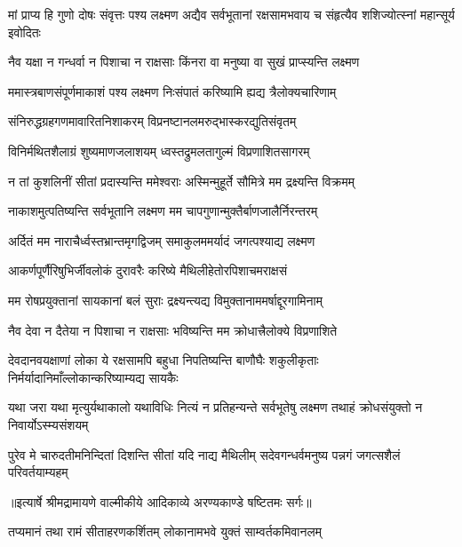 \threelineshloka
{मां प्राप्य हि गुणो दोषः संवृत्तः पश्य लक्ष्मण}
{अद्यैव सर्वभूतानां रक्षसामभवाय च}
{संहृत्यैव शशिज्योत्स्नां महान्सूर्य इवोदितः} %

\twolineshloka
{नैव यक्षा न गन्धर्वा न पिशाचा न राक्षसाः}
{किंनरा वा मनुष्या वा सुखं प्राप्स्यन्ति लक्ष्मण} %

\twolineshloka
{ममास्त्रबाणसंपूर्णमाकाशं पश्य लक्ष्मण}
{निःसंपातं करिष्यामि ह्यद्य त्रैलोक्यचारिणाम्} %

\twolineshloka
{संनिरुद्धग्रहगणमावारितनिशाकरम्}
{विप्रनष्टानलमरुद्भास्करद्युतिसंवृतम्} %

\twolineshloka
{विनिर्मथितशैलाग्रं शुष्यमाणजलाशयम्}
{ध्वस्तद्रुमलतागुल्मं विप्रणाशितसागरम्} %

\twolineshloka
{न तां कुशलिनीं सीतां प्रदास्यन्ति ममेश्वराः}
{अस्मिन्मुहूर्ते सौमित्रे मम द्रक्ष्यन्ति विक्रमम्} %

\twolineshloka
{नाकाशमुत्पतिष्यन्ति सर्वभूतानि लक्ष्मण}
{मम चापगुणान्मुक्तैर्बाणजालैर्निरन्तरम्} %

\twolineshloka
{अर्दितं मम नाराचैर्ध्वस्तभ्रान्तमृगद्विजम्}
{समाकुलममर्यादं जगत्पश्याद्य लक्ष्मण} %

\twolineshloka
{आकर्णपूर्णैरिषुभिर्जीवलोकं दुरावरैः}
{करिष्ये मैथिलीहेतोरपिशाचमराक्षसं} %

\twolineshloka
{मम रोषप्रयुक्तानां सायकानां बलं सुराः}
{द्रक्ष्यन्त्यद्य विमुक्तानाममर्षाद्दूरगामिनाम्} %

\twolineshloka
{नैव देवा न दैतेया न पिशाचा न राक्षसाः}
{भविष्यन्ति मम क्रोधात्त्रैलोक्ये विप्रणाशिते} %

\threelineshloka
{देवदानवयक्षाणां लोका ये रक्षसामपि}
{बहुधा निपतिष्यन्ति बाणौघैः शकुलीकृताः}
{निर्मर्यादानिमाँल्लोकान्करिष्याम्यद्य सायकैः} %

\threelineshloka
{यथा जरा यथा मृत्युर्यथाकालो यथाविधिः}
{नित्यं न प्रतिहन्यन्ते सर्वभूतेषु लक्ष्मण}
{तथाहं क्रोधसंयुक्तो न निवार्योऽस्म्यसंशयम्} %

\fourlineindentedshloka
{पुरेव मे चारुदतीमनिन्दितां}
{ दिशन्ति सीतां यदि नाद्य मैथिलीम्}
{सदेवगन्धर्वमनुष्य पन्नगं}
{ जगत्सशैलं परिवर्तयाम्यहम्} %


{॥इत्यार्षे श्रीमद्रामायणे वाल्मीकीये आदिकाव्ये अरण्यकाण्डे षष्टितमः सर्गः॥}


\twolineshloka
{तप्यमानं तथा रामं सीताहरणकर्शितम्}
{लोकानामभवे युक्तं साम्वर्तकमिवानलम्} %

